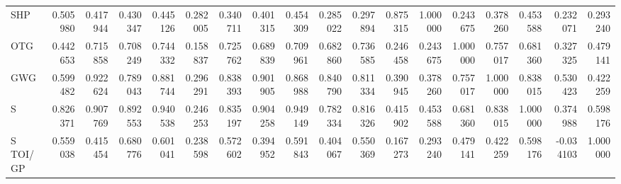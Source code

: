 \begin{tabular}{lrrrrrrrrrrrrrrrrr}
SHP & 0.505980 & 0.417944 & 0.430347 & 0.445126 & 0.282005 & 0.340711 & 0.401315 & 0.454309 & 0.285022 & 0.297894 & 0.875315 & 1.000000 & 0.243675 & 0.378260 & 0.453588 & 0.232071 & 0.293240 \\
OTG & 0.442653 & 0.715858 & 0.708249 & 0.744332 & 0.158837 & 0.725762 & 0.689839 & 0.709961 & 0.682860 & 0.736585 & 0.246458 & 0.243675 & 1.000000 & 0.757017 & 0.681360 & 0.327325 & 0.479141 \\
GWG & 0.599482 & 0.922624 & 0.789043 & 0.881744 & 0.296291 & 0.838393 & 0.901905 & 0.868988 & 0.840790 & 0.811334 & 0.390945 & 0.378260 & 0.757017 & 1.000000 & 0.838015 & 0.530423 & 0.422259 \\
S & 0.826371 & 0.907769 & 0.892553 & 0.940538 & 0.246253 & 0.835197 & 0.904258 & 0.949149 & 0.782334 & 0.816326 & 0.415902 & 0.453588 & 0.681360 & 0.838015 & 1.000000 & 0.374988 & 0.598176 \\
S%
TOI/GP & 0.559038 & 0.415454 & 0.680776 & 0.601041 & 0.238598 & 0.572602 & 0.394952 & 0.591843 & 0.404067 & 0.550369 & 0.167273 & 0.293240 & 0.479141 & 0.422259 & 0.598176 & -0.034103 & 1.000000 \\
\bottomrule
\end{tabular}
